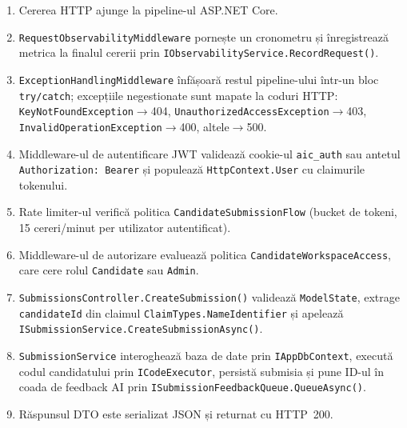 \begin{enumerate}
  \item Cererea HTTP ajunge la pipeline-ul ASP.NET Core.
  \item \texttt{RequestObservabilityMiddleware} pornește un cronometru și
        înregistrează metrica la finalul cererii prin
        \texttt{IObservabilityService.RecordRequest()}.
  \item \texttt{ExceptionHandlingMiddleware} înfășoară restul pipeline-ului
        într-un bloc \texttt{try/catch}; excepțiile negestionate sunt
        mapate la coduri HTTP: \texttt{KeyNotFoundException}$\rightarrow$404,
        \texttt{UnauthorizedAccessException}$\rightarrow$403,
        \texttt{InvalidOperationException}$\rightarrow$400, altele$\rightarrow$500.
  \item Middleware-ul de autentificare JWT validează cookie-ul \texttt{aic\_auth}
        sau antetul \texttt{Authorization: Bearer} și populează
        \texttt{HttpContext.User} cu claimurile tokenului.
  \item Rate limiter-ul verifică politica \texttt{CandidateSubmissionFlow}
        (bucket de tokeni, 15 cereri/minut per utilizator autentificat).
  \item Middleware-ul de autorizare evaluează politica
        \texttt{CandidateWorkspaceAccess}, care cere rolul
        \texttt{Candidate} sau \texttt{Admin}.
  \item \texttt{SubmissionsController.CreateSubmission()} validează
        \texttt{ModelState}, extrage \texttt{candidateId} din claimul
        \texttt{ClaimTypes.NameIdentifier} și apelează
        \texttt{ISubmissionService.CreateSubmissionAsync()}.
  \item \texttt{SubmissionService} interoghează baza de date prin
        \texttt{IAppDbContext}, execută codul candidatului prin
        \texttt{ICodeExecutor}, persistă submisia și pune ID-ul în coada
        de feedback AI prin \texttt{ISubmissionFeedbackQueue.QueueAsync()}.
  \item Răspunsul DTO este serializat JSON și returnat cu HTTP~200.
\end{enumerate}

